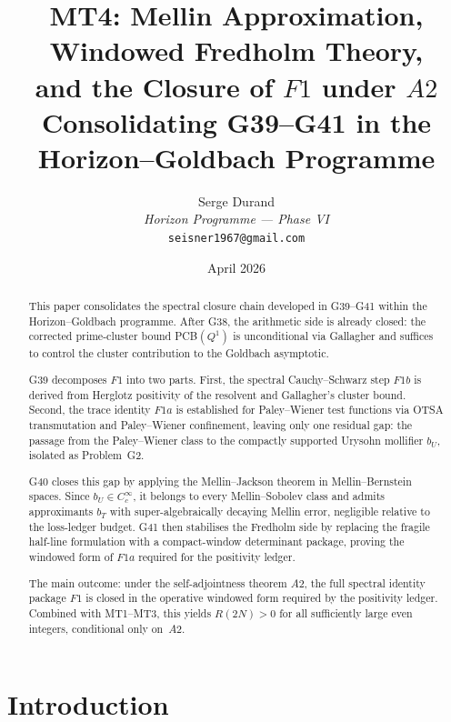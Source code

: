 \documentclass[11pt,a4paper]{article}
\title{\textbf{MT4: Mellin Approximation, Windowed Fredholm Theory,\\and the Closure of $F1$ under $A2$}\\[6pt]
\large Consolidating G39--G41 in the Horizon--Goldbach Programme}
\author{Serge Durand\\
\textit{Horizon Programme --- Phase VI}\\
\texttt{seisner1967@gmail.com}}
\date{April 2026}
\begin{document}
\maketitle

\begin{abstract}
This paper consolidates the spectral closure chain developed in G39--G41 within the Horizon--Goldbach programme.  After G38, the arithmetic side is already closed: the corrected prime-cluster bound PCB$(Q^1)$ is unconditional via Gallagher and suffices to control the cluster contribution to the Goldbach asymptotic.

G39 decomposes $F1$ into two parts.  First, the spectral Cauchy--Schwarz step $F1b$ is derived from Herglotz positivity of the resolvent and Gallagher's cluster bound.  Second, the trace identity $F1a$ is established for Paley--Wiener test functions via OTSA transmutation and Paley--Wiener confinement, leaving only one residual gap: the passage from the Paley--Wiener class to the compactly supported Urysohn mollifier $b_U$, isolated as Problem~G2.

G40 closes this gap by applying the Mellin--Jackson theorem in Mellin--Bernstein spaces.  Since $b_U\in C_c^\infty$, it belongs to every Mellin--Sobolev class and admits approximants $b_T$ with super-algebraically decaying Mellin error, negligible relative to the loss-ledger budget.  G41 then stabilises the Fredholm side by replacing the fragile half-line formulation with a compact-window determinant package, proving the windowed form of $F1a$ required for the positivity ledger.

The main outcome: under the self-adjointness theorem $A2$, the full spectral identity package $F1$ is closed in the operative windowed form required by the positivity ledger.  Combined with MT1--MT3, this yields $R(2N)>0$ for all sufficiently large even integers, conditional only on~$A2$.
\end{abstract}

\bigskip
\begin{center}
\end{center}
\bigskip

\tableofcontents

\section{Introduction}
\end{document}
